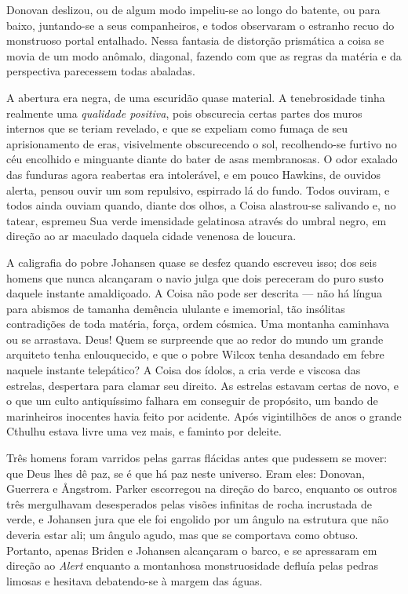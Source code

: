 \begin{pages}
\begin{Rightside}
Donovan deslizou, ou de algum modo impeliu-se ao longo do batente, ou
para baixo, juntando-se a seus companheiros, e todos observaram o
estranho recuo do monstruoso portal entalhado. Nessa fantasia de
distorção prismática a coisa se movia de um modo anômalo, diagonal,
fazendo com que as regras da matéria e da perspectiva parecessem todas
abaladas.

A abertura era negra, de uma escuridão quase material. A tenebrosidade
tinha realmente uma \emph{qualidade positiva}, pois obscurecia certas
partes dos muros internos que se teriam revelado, e que se expeliam como
fumaça de seu aprisionamento de eras, visivelmente obscurecendo o sol,
recolhendo-se furtivo no céu encolhido e minguante diante do bater de
asas membranosas. O odor exalado das funduras agora reabertas era
intolerável, e em pouco Hawkins, de ouvidos alerta, pensou ouvir um som
repulsivo, espirrado lá do fundo. Todos ouviram, e todos ainda ouviam
quando, diante dos olhos, a Coisa alastrou-se salivando e, no tatear,
espremeu Sua verde imensidade gelatinosa através do umbral negro, em
direção ao ar maculado daquela cidade venenosa de loucura.

A caligrafia do pobre Johansen quase se desfez quando escreveu isso; dos
seis homens que nunca alcançaram o navio julga que dois pereceram do
puro susto daquele instante amaldiçoado. A Coisa não pode ser descrita
--- não há língua para abismos de tamanha demência ululante e imemorial,
tão insólitas contradições de toda matéria, força, ordem cósmica. Uma
montanha caminhava ou se arrastava. Deus! Quem se surpreende que ao
redor do mundo um grande arquiteto tenha enlouquecido, e que o pobre
Wilcox tenha desandado em febre naquele instante telepático? A Coisa dos
ídolos, a cria verde e viscosa das estrelas, despertara para clamar seu
direito. As estrelas estavam certas de novo, e o que um culto
antiquíssimo falhara em conseguir de propósito, um bando de marinheiros
inocentes havia feito por acidente. Após vigintilhões de anos o grande
Cthulhu estava livre uma vez mais, e faminto por deleite.

Três homens foram varridos pelas garras flácidas antes que pudessem se
mover: que Deus lhes dê paz, se é que há paz neste universo. Eram eles:
Donovan, Guerrera e Ångstrom. Parker escorregou na direção do barco,
enquanto os outros três mergulhavam desesperados pelas visões infinitas
de rocha incrustada de verde, e Johansen jura que ele foi engolido por
um ângulo na estrutura que não deveria estar ali; um ângulo agudo, mas
que se comportava como obtuso. Portanto, apenas Briden e Johansen
alcançaram o barco, e se apressaram em direção ao \emph{Alert} enquanto
a montanhosa monstruosidade defluía pelas pedras limosas e hesitava
debatendo-se à margem das águas.


\end{Rightside}
\end{pages}
